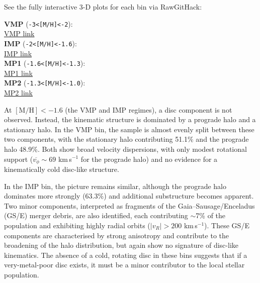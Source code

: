 \documentclass[a4paper,12pt]{article}
\begin{document}
See the fully interactive 3-D plots for each bin via RawGitHack:\medskip

\setlength\parskip{2pt}  %

\textbf{VMP} (\texttt{-3\textless[M/H]\textless-2}):\\
\href{https://raw.githack.com/raunaq-rai/Disentangling-the-Milky-Way-using-GMM/main/figures/VMP__-3%5BM_H%5D-2.html}{VMP link}\\[3pt]
\textbf{IMP} (\texttt{-2\textless[M/H]\textless-1.6}):\\
\href{https://raw.githack.com/raunaq-rai/Disentangling-the-Milky-Way-using-GMM/main/figures/IMP__-2%5BM_H%5D-1.6.html}{IMP link}\\[3pt]
\textbf{MP1} (\texttt{-1.6\textless[M/H]\textless-1.3}):\\
\href{https://raw.githack.com/raunaq-rai/Disentangling-the-Milky-Way-using-GMM/main/figures/MP1__-1.6%5BM_H%5D-1.3.html}{MP1 link}\\[3pt]
\textbf{MP2} (\texttt{-1.3\textless[M/H]\textless-1.0}):\\
\href{https://raw.githack.com/raunaq-rai/Disentangling-the-Milky-Way-using-GMM/main/figures/MP2__-1.3%5BM_H%5D-1.0.html}{MP2 link}




At $\mathrm{[M/H]} < -1.6$ (the VMP and IMP regimes), a disc component is not observed. Instead, the kinematic structure 
is dominated by a prograde halo and a stationary halo. In the VMP bin, the sample is almost evenly split between these 
two components, with the stationary halo contributing 51.1\% and the prograde halo 48.9\%. Both show broad velocity 
dispersions, with only modest rotational support ($\overline{v_\phi} \sim 69$ km\,s$^{-1}$ for the prograde halo) 
and no evidence for a kinematically cold disc-like structure.

In the IMP bin, the picture remains similar, although the prograde halo dominates more strongly 
(63.3\%) and additional substructure becomes apparent. Two minor components, interpreted as fragments of the 
Gaia–Sausage/Enceladus (GS/E) merger debris, are also identified, each contributing $\sim$7\% of the population 
and exhibiting highly radial orbits ($|v_R| > 200$ km\,s$^{-1}$). These GS/E components are characterised by 
strong anisotropy and contribute to the broadening of the halo distribution, but again show no signature of 
disc-like kinematics. The absence of a cold, rotating disc in these bins suggests that if a very-metal-poor 
disc exists, it must be a minor contributor to the local stellar population.
\end{document}
